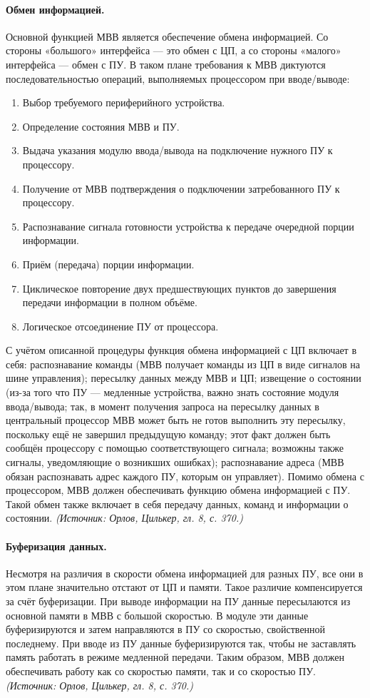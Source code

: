 \documentclass[a4paper,12pt]{article}
\begin{document}
\paragraph{Обмен информацией.}
Основной функцией МВВ является обеспечение обмена информацией. Со стороны «большого» интерфейса — это обмен с ЦП, а со стороны «малого» интерфейса — обмен с ПУ. В таком плане требования к МВВ диктуются последовательностью операций, выполняемых процессором при вводе/выводе:
\begin{enumerate}[label=\arabic*)]
\item Выбор требуемого периферийного устройства.
\item Определение состояния МВВ и ПУ.
\item Выдача указания модулю ввода/вывода на подключение нужного ПУ к процессору.
\item Получение от МВВ подтверждения о подключении затребованного ПУ к процессору.
\item Распознавание сигнала готовности устройства к передаче очередной порции информации.
\item Приём (передача) порции информации.
\item Циклическое повторение двух предшествующих пунктов до завершения передачи информации в полном объёме.
\item Логическое отсоединение ПУ от процессора.
\end{enumerate}
С учётом описанной процедуры функция обмена информацией с ЦП включает в себя: распознавание команды (МВВ получает команды из ЦП в виде сигналов на шине управления); пересылку данных между МВВ и ЦП; извещение о состоянии (из-за того что ПУ — медленные устройства, важно знать состояние модуля ввода/вывода; так, в момент получения запроса на пересылку данных в центральный процессор МВВ может быть не готов выполнить эту пересылку, поскольку ещё не завершил предыдущую команду; этот факт должен быть сообщён процессору с помощью соответствующего сигнала; возможны также сигналы, уведомляющие о возникших ошибках); распознавание адреса (МВВ обязан распознавать адрес каждого ПУ, которым он управляет). Помимо обмена с процессором, МВВ должен обеспечивать функцию обмена информацией с ПУ. Такой обмен также включает в себя передачу данных, команд и информации о состоянии.
\textit{(Источник: Орлов, Цилькер, гл. 8, с. 370.)}

\paragraph{Буферизация данных.}
Несмотря на различия в скорости обмена информацией для разных ПУ, все они в этом плане значительно отстают от ЦП и памяти. Такое различие компенсируется за счёт буферизации. При выводе информации на ПУ данные пересылаются из основной памяти в МВВ с большой скоростью. В модуле эти данные буферизируются и затем направляются в ПУ со скоростью, свойственной последнему. При вводе из ПУ данные буферизируются так, чтобы не заставлять память работать в режиме медленной передачи. Таким образом, МВВ должен обеспечивать работу как со скоростью памяти, так и со скоростью ПУ.
\textit{(Источник: Орлов, Цилькер, гл. 8, с. 370.)}
\end{document}
